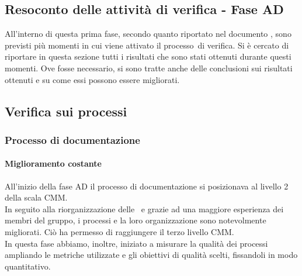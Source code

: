 \documentclass[../PianoDiQualifica.tex]{subfiles}
\begin{document}
\begin{appendices}
\section{Resoconto delle attività di verifica - Fase AD}
All'interno di questa prima fase\g, secondo quanto riportato nel documento \pianodiprogettov, sono previsti più momenti in cui viene attivato il processo\g\ di verifica. Si è cercato di riportare in questa sezione tutti i risultati che sono stati ottenuti durante questi momenti. Ove fosse necessario, si sono tratte anche delle conclusioni sui risultati ottenuti e su come essi possono essere migliorati.
	
	\subsection{Verifica sui processi}
		\subsubsection{Processo di documentazione}
			\paragraph{Miglioramento costante}
			All'inizio della fase AD il processo di documentazione si posizionava al livello 2 della scala CMM.\\
			In seguito alla riorganizzazione delle \normediprogettov\ e grazie ad una maggiore esperienza dei membri del gruppo, i processi e la loro organizzazione sono notevolmente migliorati. Ciò ha permesso di raggiungere il terzo livello CMM.\\
			In questa fase abbiamo, inoltre, iniziato a misurare la qualità dei processi ampliando le metriche utilizzate e gli obiettivi di qualità scelti, fissandoli in modo quantitativo.
			

\end{appendices}
\end{document}
